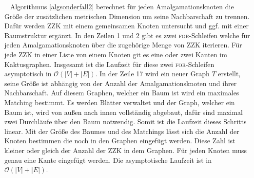 \vspace{-2mm}
~\linebreak
Algorithmus \ref{algsonderfall2} berechnet für jeden Amalgamationsknoten die Größe der zusätzlichen metrischen Dimension um seine Nachbarschaft zu trennen. Dafür werden ZZK mit einem gemeinsamen Knoten untersucht und ggf. mit einer Baumstruktur ergänzt.\vspace{-1mm}\newline\newline %
In den Zeilen 1 und 2 gibt es zwei \textsc{for}-Schleifen welche für jeden Amalgamationsknoten über die zugehörige Menge von ZZK iterieren. Für jede ZZK in einer Liste von einem Knoten git es eine oder zwei Kanten im Kaktusgraphen. Insgesamt ist die Laufzeit für diese zwei \textsc{for}-Schleifen asymptotisch in $\mathcal{O}(|V|+|E|)$.\vspace{-1mm}\newline\newline
In der Zeile 17 wird ein neuer Graph $T$ erstellt, seine Größe ist abhängig von der Anzahl der Amalgamationsknoten und ihrer Nachbarschaft. Auf diesem Graphen, welcher ein Baum ist wird ein maximales Matching bestimmt. Es werden Blätter verwaltet und der Graph, welcher ein Baum ist, wird von außen nach innen vollständig abgebaut, dafür sind maximal zwei Durchläufe über den Baum notwendig. Somit ist die Laufzeit dieses Schritts linear.\vspace{-1mm}\newline\newline
Mit der Größe des Baumes und des Matchings lässt sich die Anzahl der Knoten bestimmen die noch in den Graphen eingefügt werden. Diese Zahl ist kleiner oder gleich der Anzahl der ZZK in dem Graphen. Für jeden Knoten muss genau eine Kante eingefügt werden. Die asymptotische Laufzeit ist in $\mathcal{O}(|V|+|E|)$.
